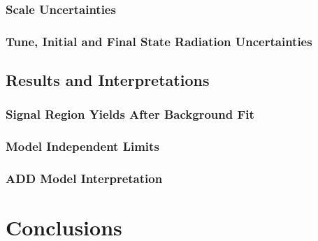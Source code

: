 \documentclass[10pt,twoside,cucitura,classica,openany]{toptesi}
\begin{document}


\subsection{Scale Uncertainties}
\label{sec:renorm-fact-scale}



\subsection{Tune, Initial and Final State Radiation Uncertainties}
\label{sec:tune-uncertainties}



\section{Results and Interpretations}
\label{sec:results-interpr}



\subsection{Signal Region Yields After Background Fit}
\label{sec:signal-region-yields}



\subsection{Model Independent Limits}
\label{sec:model-indep-limits-1}



\subsection{ADD Model Interpretation}
\label{sec:add-model-interpr}



\chapter{Conclusions}
\label{cha:conclusions}



 \printbibliography
\end{document}
